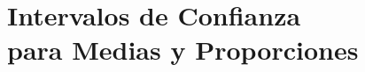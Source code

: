 
\chapter[Intervalos de Confianza para Medias y Proporciones]{Intervalos de Confianza\\ para Medias y Proporciones}\label{cap:intervalos-confianza-1-poblacion}






